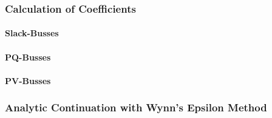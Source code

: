 \subsubsection{Calculation of Coefficients}

\paragraph{Slack-Busses}

\paragraph{PQ-Busses}

\paragraph{PV-Busses}

\subsubsection{Analytic Continuation with Wynn's Epsilon Method}
